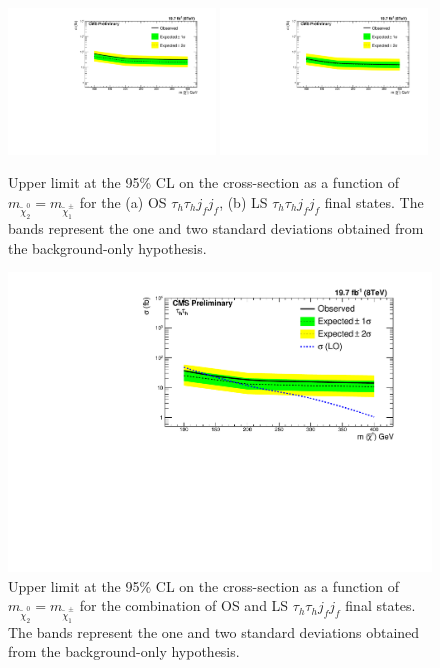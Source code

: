 \begin{figure}
	\begin{center}
		\includegraphics[width=0.49\textwidth]{PLOTS/Limit_VBF_diTau_OS.pdf}
		\includegraphics[width=0.49\textwidth]{PLOTS/Limit_VBF_diTau_LS.pdf}
		\caption{Upper limit at the 95\% CL on the cross-section as a function of 
			$m_{\tilde{\chi}_{2}^{0}}=m_{\tilde{\chi}_{1}^{\pm}}$ for the (a) OS 
			$\tau_{h}\tau_{h} j_{f} j_{f}$, (b) LS $\tau_{h}\tau_{h} j_{f} j_{f}$
			final states. The bands represent the one and two standard deviations obtained from the background-only hypothesis.}
		\label{fig:LimitsOSLS}
	\end{center}
\end{figure}

\begin{figure}
	\begin{center}
		\includegraphics[angle=0,scale=0.75]{PLOTS/Limit_VBF_diTau_combined.pdf}
		\caption{Upper limit at the 95\% CL on the cross-section as a function of 
			$m_{\tilde{\chi}_{2}^{0}}=m_{\tilde{\chi}_{1}^{\pm}}$ for the combination of OS and LS $\tau_{h}\tau_{h} j_{f} j_{f}$
			final states. The bands represent the one and two standard deviations obtained from the background-only hypothesis.}
		\label{fig:LimitsCombination}
	\end{center}
\end{figure}

